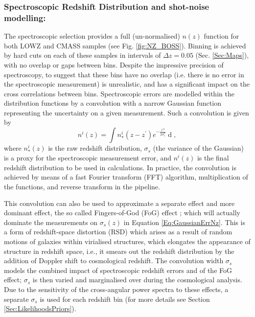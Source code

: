 \subsubsection{Spectroscopic Redshift Distribution and shot-noise modelling:}\label{Sec:SpecNz}
The spectroscopic selection provides a full (un-normalised) $n(z)$ function for both LOWZ and CMASS samples (see Fig. \ref{fig:NZ_BOSS}). Binning is achieved by hard cuts on each of these samples in intervals of $\Delta z = 0.05$ (Sec. \ref{Sec:Maps}), with no overlap or gaps between bins. Despite the impressive precision of spectroscopy, to suggest that these bins have no overlap (i.e. there is no error in the spectroscopic measurement) is unrealistic, and has a significant impact on the cross correlations between bins. Spectroscopic errors are modelled within the distribution functions by a convolution with a narrow Gaussian function representing the uncertainty on a given measurement. Such a convolution is given by
\begin{equation}
n^i(z) = \int n_*^i(z-z^\prime) e^{-\frac{z^{\prime 2}}{2\sigma_s^2}} \mathop{dz^\prime},
\label{Eq:GaussianErrNz}
\end{equation}
where $n_*^i(z)$ is the raw redshift distribution, $\sigma_s$ (the variance of the Gaussian) is a proxy for the spectroscopic measurement error, and $n^i(z)$ is the final redshift distribution to be used in calculations. In practice, the convolution is achieved by means of a fast Fourier transform (FFT) algorithm, multiplication of the functions, and reverse transform in the \uclcl pipeline.

\qquad This convolution can also be used to approximate a separate effect and more dominant effect, the so called Fingers-of-God (FoG) effect \citep{Percival-FoG2011}; which will actually dominate the measurements on $\sigma_s(z)$ in Equation \eqref{Eq:GaussianErrNz}. This is a form of redshift-space distortion (RSD) which arises as a result of random motions of galaxies within virialised structures, which elongates the appearance of structure in redshift space, i.e., it smears out the redshift distribution by the addition of Doppler shift to cosmological redshift. The convolution width $\sigma_s$ models the combined impact of spectroscopic redshift errors and of the FoG effect; $\sigma_s$ is then varied and marginalised over during the cosmological analysis. Due to the sensitivity of the cross-angular power spectra to these effects, a separate $\sigma_s$ is used for each redshift bin (for more details see Section \ref{Sec:LikelihoodsPriors}).

